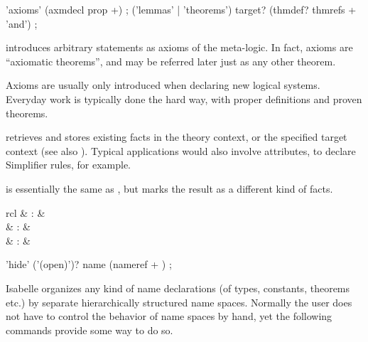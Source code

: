 \begin{isabellebody}
\begin{isamarkuptext}
  \begin{rail}
    'axioms' (axmdecl prop +)
    ;
    ('lemmas' | 'theorems') target? (thmdef? thmrefs + 'and')
    ;
  \end{rail}

  \begin{descr}
  
  \item [\mbox{\isa{\isacommand{axioms}}}~\isa{a{\isacharcolon}\ {\isasymphi}}] introduces arbitrary
  statements as axioms of the meta-logic.  In fact, axioms are
  ``axiomatic theorems'', and may be referred later just as any other
  theorem.
  
  Axioms are usually only introduced when declaring new logical
  systems.  Everyday work is typically done the hard way, with proper
  definitions and proven theorems.
  
  \item [\mbox{\isa{\isacommand{lemmas}}}~\isa{a\ {\isacharequal}\ b\isactrlsub {\isadigit{1}}\ {\isasymdots}\ b\isactrlsub n}]
  retrieves and stores existing facts in the theory context, or the
  specified target context (see also ).  Typical
  applications would also involve attributes, to declare Simplifier
  rules, for example.
  
  \item [\mbox{\isa{\isacommand{theorems}}}] is essentially the same as \mbox{}, but marks the result as a different kind of facts.

  \end{descr}%
\end{isamarkuptext}%
\isamarkuptrue%
%
\isamarkuptrue%
%
\begin{isamarkuptext}%
\begin{matharray}{rcl}
    \mbox{} & : &  \\
    \mbox{} & : &  \\
    \mbox{} & : &  \\
  \end{matharray}

  \begin{rail}
    'hide' ('(open)')? name (nameref + )
    ;
  \end{rail}

  Isabelle organizes any kind of name declarations (of types,
  constants, theorems etc.) by separate hierarchically structured name
  spaces.  Normally the user does not have to control the behavior of
  name spaces by hand, yet the following commands provide some way to
  do so.


\end{isamarkuptext}
\end{isabellebody}
